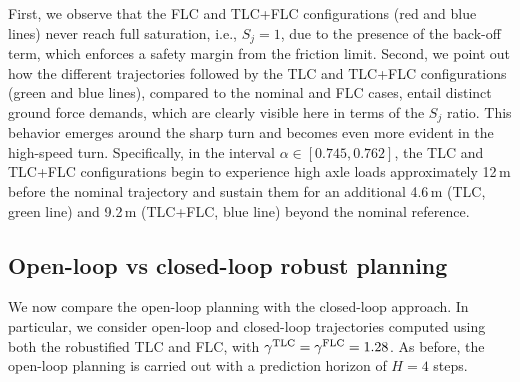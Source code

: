 First, we observe that the FLC and TLC+FLC configurations (red and blue lines) never reach full saturation, i.e., $S_j=1$, due to the presence of the back-off term, which enforces a safety margin from the friction limit.
Second, we point out how the different trajectories followed by the TLC and TLC+FLC configurations (green and blue lines), compared to the nominal and FLC cases, entail distinct ground force demands, which are clearly visible here in terms of the $S_j$ ratio.
This behavior emerges around the sharp turn and becomes even more evident in the high-speed turn.
Specifically, in the interval $\alpha \in [0.745, 0.762]$, the TLC and TLC+FLC configurations begin to experience high axle loads approximately 12\,m before the nominal trajectory and sustain them for an additional 4.6\,m (TLC, green line) and 9.2\,m (TLC+FLC, blue line) beyond the nominal reference.


\subsection{Open-loop vs closed-loop robust planning}
We now compare the open-loop planning with the closed-loop approach. In particular, we consider open-loop and closed-loop trajectories computed using both the robustified TLC and FLC, with $\gamma^\textrm{TLC}=\gamma^\textrm{FLC}=1.28$. As before, the open-loop planning is carried out with a prediction horizon of $H=4$ steps.

